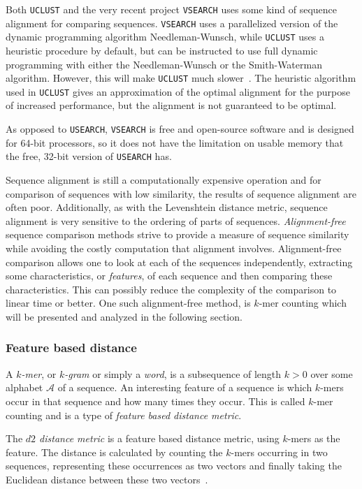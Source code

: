 Both \texttt{UCLUST} and the very recent project \texttt{VSEARCH} uses some
kind of sequence alignment for comparing sequences. \texttt{VSEARCH} uses a
parallelized version of the dynamic programming algorithm Needleman-Wunsch,
while \texttt{UCLUST} uses a heuristic procedure by default, but can be
instructed to use full dynamic programming with either the Needleman-Wunsch or
the Smith-Waterman algorithm. However, this will make \texttt{UCLUST} much
slower~\cite{vsearch}. The heuristic algorithm used in \texttt{UCLUST} gives an
approximation of the optimal alignment for the purpose of increased
performance, but the alignment is not guaranteed to be optimal.

As opposed to \texttt{USEARCH}, \texttt{VSEARCH} is free and open-source
software and is designed for 64-bit processors, so it does not have the
limitation on usable memory that the free, 32-bit version of \texttt{USEARCH}
has.

Sequence alignment is still a computationally expensive operation and for
comparison of sequences with low similarity, the results of sequence alignment
are often poor. Additionally, as with the Levenshtein distance metric, sequence
alignment is very sensitive to the ordering of parts of sequences.
\emph{Alignment-free} sequence comparison methods strive to provide a measure
of sequence similarity while avoiding the costly computation that alignment
involves. Alignment-free comparison allows one to look at each of the sequences
independently, extracting some characteristics, or \emph{features}, of each
sequence and then comparing these characteristics. This can possibly reduce the
complexity of the comparison to linear time or better. One such alignment-free
method, is $k$-mer counting which will be presented and analyzed in the
following section.


\subsubsection{Feature based distance} \label{sec:kmer_distance}

A \emph{$k$-mer}, or \emph{$k$-gram} or simply a \emph{word}, is a subsequence
of length $k>0$ over some alphabet $\mathcal{A}$ of a sequence. An interesting
feature of a sequence is which $k$-mers occur in that sequence and how many
times they occur. This is called $k$-mer counting and is a type of
\emph{feature based distance metric}.

The \emph{$d2$ distance metric} is a feature based distance metric, using
$k$-mers as the feature. The distance is calculated by counting the $k$-mers
occurring in two sequences, representing these occurrences as two vectors and
finally taking the Euclidean distance between these two
vectors~\cite[pp.~53--54]{dong}.

